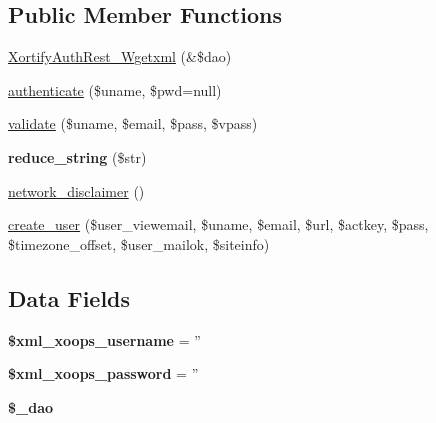 \subsection*{Public Member Functions}
\begin{DoxyCompactItemize}
\item 
\hyperlink{class_xortify_auth_rest___wgetxml_a84ac6c33916f84f4dc6c94124aae0cb4}{Xortify\-Auth\-Rest\-\_\-\-Wgetxml} (\&\$dao)
\item 
\hyperlink{class_xortify_auth_rest___wgetxml_a00678ba307326b734e6c679f28bea315}{authenticate} (\$uname, \$pwd=null)
\item 
\hyperlink{class_xortify_auth_rest___wgetxml_a91121a1b702dfd20fb65a027c8ed26ec}{validate} (\$uname, \$email, \$pass, \$vpass)
\item 
\hypertarget{class_xortify_auth_rest___wgetxml_ae463a3baa44e95fa5b5151ab2334df1c}{{\bfseries reduce\-\_\-string} (\$str)}\label{class_xortify_auth_rest___wgetxml_ae463a3baa44e95fa5b5151ab2334df1c}

\item 
\hyperlink{class_xortify_auth_rest___wgetxml_a1874c27b6f81a3f2ff9015405ad0f8bc}{network\-\_\-disclaimer} ()
\item 
\hyperlink{class_xortify_auth_rest___wgetxml_ac72efc5ad313a592cf6706876f56f7ec}{create\-\_\-user} (\$user\-\_\-viewemail, \$uname, \$email, \$url, \$actkey, \$pass, \$timezone\-\_\-offset, \$user\-\_\-mailok, \$siteinfo)
\end{DoxyCompactItemize}
\subsection*{Data Fields}
\begin{DoxyCompactItemize}
\item 
\hypertarget{class_xortify_auth_rest___wgetxml_a725df0dd6b578e15522ed15945e5901c}{{\bfseries \$xml\-\_\-xoops\-\_\-username} = ''}\label{class_xortify_auth_rest___wgetxml_a725df0dd6b578e15522ed15945e5901c}

\item 
\hypertarget{class_xortify_auth_rest___wgetxml_a8ec2889165c837354fded1cedbd42157}{{\bfseries \$xml\-\_\-xoops\-\_\-password} = ''}\label{class_xortify_auth_rest___wgetxml_a8ec2889165c837354fded1cedbd42157}

\item 
\hypertarget{class_xortify_auth_rest___wgetxml_a12a029c610f699b4b25e79a1f64a3485}{{\bfseries \$\-\_\-dao}}\label{class_xortify_auth_rest___wgetxml_a12a029c610f699b4b25e79a1f64a3485}

\end{DoxyCompactItemize}


